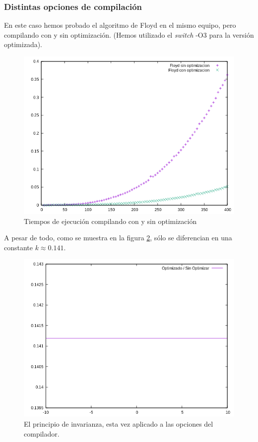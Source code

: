 \documentclass{article}
\begin{document}
\subsubsection{Distintas opciones de compilación}
En este caso hemos probado el algoritmo de Floyd en el mismo equipo, pero compilando con y sin optimización. (Hemos utilizado el \textit{switch} -O3 para la versión optimizada).

\begin{figure}[H]
	\centering
	\includegraphics[totalheight=8cm]{img/optimizacion_floyd}
	\caption{Tiempos de ejecución compilando con y sin optimización}
	\label{fig:optimizacion_floyd}
\end{figure}

A pesar de todo, como se muestra en la figura \ref{fig:optimizacion_cociente}, sólo se diferencian en una constante $k \approx 0.141 $.
\begin{figure}[H]
	\centering
	\includegraphics[totalheight=8cm]{img/optimizacion_cociente}
	\caption{El principio de invarianza, esta vez aplicado a las opciones del compilador.}
	\label{fig:optimizacion_cociente}
\end{figure}
\end{document}
